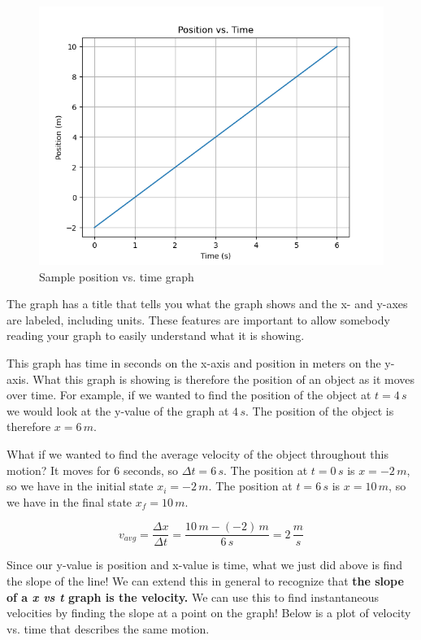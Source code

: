 \documentclass[12pt]{book}
\begin{document}
\begin{figure}[H]
\centering
\includegraphics[scale=0.6]{position1.png}
\caption{Sample position vs. time graph}
\label{pos1}
\end{figure}

The graph has a title that tells you what the graph shows and the x- and y-axes are labeled, including units. These features are important to allow somebody reading your graph to easily understand what it is showing. 

This graph has time in seconds on the x-axis and position in meters on the y-axis. What this graph is showing is therefore the position of an object as it moves over time. For example, if we wanted to find the position of the object at $t = 4 \, s$ we would look at the y-value of the graph at $4 \, s$. The position of the object is therefore $x = 6 \, m$.

What if we wanted to find the average velocity of the object throughout this motion? It moves for 6 seconds, so $\Delta t = 6 \, s$. The position at $t = 0 \, s$ is $x = -2 \, m$, so we have in the initial state $x_i = -2 \, m$. The position at $t = 6 \, s$ is $x = 10 \, m$, so we have in the final state $x_f = 10 \, m$.

\begin{equation}
v_{avg} = \frac{\Delta x}{\Delta t} = \frac{10 \, m - (-2) \, m}{6 \, s} = 2 \, \frac{m}{s}
\end{equation}

Since our y-value is position and x-value is time, what we just did above is find the slope of the line! We can extend this in general to recognize that \textbf{the slope of a \textit{x vs t} graph is the velocity.} We can use this to find instantaneous velocities by finding the slope at a point on the graph! Below is a plot of velocity vs. time that describes the same motion.
\end{document}

